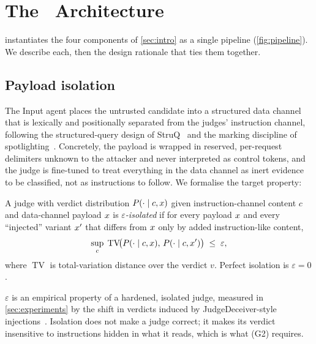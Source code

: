 \section{The \Aegis\ Architecture}
\label{sec:method}

\Aegis instantiates the four components of \cref{sec:intro} as a single pipeline
(\cref{fig:pipeline}). We describe each, then the design rationale that ties them
together.



\subsection{Payload isolation}
\label{sec:isolation}
The Input agent places the untrusted candidate into a structured data channel that is
lexically and positionally separated from the judges' instruction channel, following the
structured-query design of StruQ~\cite{chen2024struq} and the marking discipline of
spotlighting~\cite{hines2024spotlighting}. Concretely, the payload is wrapped in
reserved, per-request delimiters unknown to the attacker and never interpreted as
control tokens, and the judge is fine-tuned to treat everything in the data channel as
inert evidence to be classified, not as instructions to follow. We formalise the target
property:
\begin{definition}
\label{def:isolation}
A judge with verdict distribution $P(\cdot\mid c,x)$ given instruction-channel content
$c$ and data-channel payload $x$ is \emph{$\varepsilon$-isolated} if for every payload
$x$ and every ``injected'' variant $x'$ that differs from $x$ only by added
instruction-like content,
\begin{equation}
  \sup_{c}\; \operatorname{TV}\!\bigl(P(\cdot\mid c,x),\,P(\cdot\mid c,x')\bigr)\;\le\;\varepsilon ,
  \label{eq:isolation}
\end{equation}
where $\operatorname{TV}$ is total-variation distance over the verdict $v$. Perfect
isolation is $\varepsilon=0$.
\end{definition}
$\varepsilon$ is an empirical property of a hardened, isolated judge, measured in
\cref{sec:experiments} by the shift in verdicts induced by JudgeDeceiver-style
injections~\cite{shi2024judgeinjection}. Isolation does not make a judge correct; it makes
its verdict insensitive to instructions hidden in what it reads, which is what (G2)
requires.


